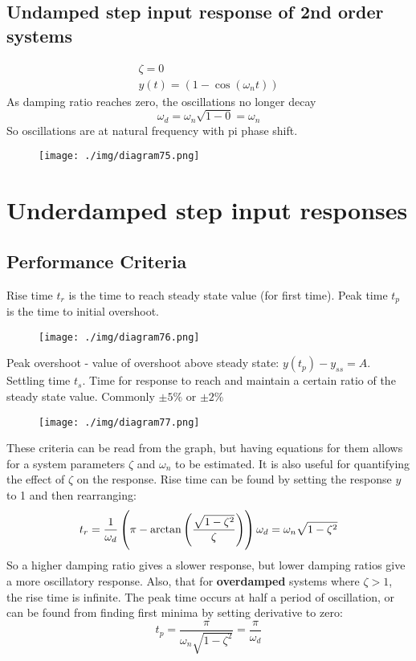 \subsection{Undamped step input response of 2nd order systems}
\begin{align}
  \zeta = 0 \\
  y(t) = \left(1 - \cos{(\omega_n t)}\right)
\end{align}
As damping ratio reaches zero, the oscillations no longer decay
\begin{equation}
  \omega_d = \omega_n \sqrt{1 - 0} = \omega_n
\end{equation}
So oscillations are at natural frequency with pi phase shift.
\begin{figure}[H]
  \centering
  \texttt{[image: ./img/diagram75.png]}
\end{figure}
\section{Underdamped step input responses}
\subsection{Performance Criteria}
Rise time $t_r$ is the time to reach steady state value (for first time). Peak time $t_p$ is the time to initial overshoot.
\begin{figure}[H]
  \centering
  \texttt{[image: ./img/diagram76.png]}
\end{figure}
Peak overshoot - value of overshoot above steady state: $ y(t_p) - y_{ss} = A$. Settling time $t_s$. Time for response to reach and maintain a certain ratio of the steady state value. Commonly $\pm 5\%$ or $\pm 2\%$
\begin{figure}[H]
  \centering
  \texttt{[image: ./img/diagram77.png]}
\end{figure}
These criteria can be read from the graph, but having equations for them allows for a system parameters $\zeta$ and $\omega_n$ to be estimated. It is also useful for quantifying the effect of $\zeta$ on the response. Rise time can be found by setting the response $y$ to 1 and then rearranging:
\begin{equation}
  t_r = \frac{1}{\omega_d} \left( \pi - \arctan{\left( \frac{\sqrt{1-\zeta^2}}{\zeta} \right)} \right)\\
  \omega_d = \omega_n \sqrt{1-\zeta^2}
\end{equation}
So a higher damping ratio gives a slower response, but lower damping ratios give a more oscillatory response. Also, that for \textbf{overdamped} systems where $\zeta > 1$, the rise time is infinite. The peak time occurs at half a period of oscillation, or can be found from finding first minima by setting derivative to zero:
\begin{equation}
  t_p = \frac{\pi}{\omega_n\sqrt{1 - \zeta^2}} = \frac{\pi}{\omega_d}
\end{equation}
